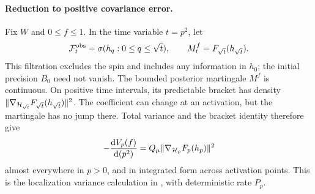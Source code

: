 \paragraph{Reduction to positive covariance error.}
Fix \(W\) and \(0\le f\le1\).  In the time variable \(t=p^2\), let
\[
 \mathcal F_t^{\rm obs}=\sigma(h_q:0\le q\le\sqrt t),
 \qquad M_t^f=F_{\sqrt t}(h_{\sqrt t}).
\]
This filtration excludes the spin and includes any information in
\(h_0\); the initial precision \(B_0\) need not vanish.  The bounded
posterior martingale \(M^f\) is continuous.  On positive time intervals,
its predictable bracket has density
\(\|\nabla_{\mathcal H_{\sqrt t}}F_{\sqrt t}(h_{\sqrt t})\|^2\).
The coefficient can change at an activation, but the martingale has no
jump there.  Total variance and the bracket identity therefore give
\begin{equation}\label{edge:variance-identity}
 -\frac{\mathrm dV_p(f)}{\mathrm d(p^2)}
       =Q_\mu\|\nabla_{\mathcal H_p}F_p(h_p)\|^2
\end{equation}
almost everywhere in \(p>0\), and in integrated form across activation
points.  This is the localization variance calculation in
\cite[proof of Theorem~1, Equation~(14) and the display after Equation~(15)]{EldanKoehlerZeitouni2022},
with deterministic rate \(P_p\).

